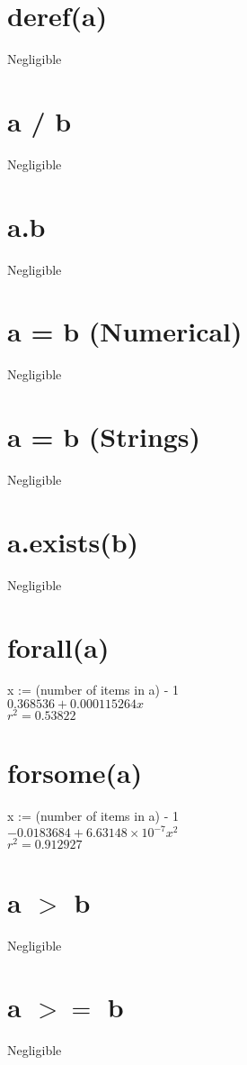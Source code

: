 \documentclass[12pt]{article}
\begin{document}
	\section{deref(a)}
	Negligible
	
	\section{a / b}
	Negligible
	
	\section{a.b}
	Negligible
	
	\section{a = b (Numerical)}
	Negligible
	
	\section{a = b (Strings)}
	Negligible
	
	\section{a.exists(b)}
	Negligible
	
	\section{forall(a)}
	x := (number of items in a) - 1\\
	$0.368536 + 0.000115264 x$\\
	$r^2 = 0.53822$
	
	\section{forsome(a)}
	x := (number of items in a) - 1\\
	$-0.0183684 + 6.63148 \times 10^{-7} x^2$\\
	$r^2 = 0.912927$
	
	\section{a $>$ b}
	Negligible
	
	\section{a $>=$ b}
	Negligible
	
\end{document}
